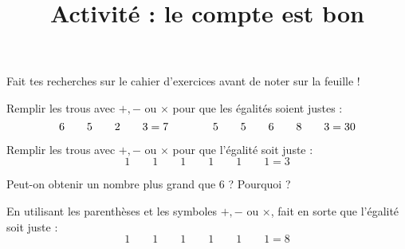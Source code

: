 \documentclass[a4paper,12pt]{article}
\title{Activité : le compte est bon}
\date{}
\begin{document}
\maketitle

\begin{greybox}
	Fait tes recherches sur le cahier d'exercices avant de noter sur la feuille !
\end{greybox}

\begin{exercice}
	Remplir les trous avec $+, -$ ou $×$ pour que les égalités soient justes :
	$$  6 \hspace{2em} 5 \hspace{2em} 2 \hspace{2em} 3 = 7
		\hspace{4em} 5 \hspace{2em} 5 \hspace{2em} 6 \hspace{2em} 8 \hspace{2em} 3 = \the\numexpr 5 + 5 * 6 - 8 + 3 \relax $$
\end{exercice}

\begin{exercice}
	Remplir les trous avec $+, -$ ou $×$ pour que l'égalité soit juste :
	$$ 1 \hspace{2em} 1 \hspace{2em} 1 \hspace{2em} 1 \hspace{2em} 1 \hspace{2em} 1 = 3 $$

	Peut-on obtenir un nombre plus grand que 6 ? Pourquoi ?
\end{exercice}

\centering{}

\vspace{2em}

\begin{exercice}
	En utilisant les parenthèses et les symboles $+, -$ ou $×$, fait en sorte que l'égalité soit juste :
	$$ 1 \hspace{2em} 1 \hspace{2em} 1 \hspace{2em} 1 \hspace{2em} 1 \hspace{2em} 1 = 8 $$
\end{exercice}
\end{document}
